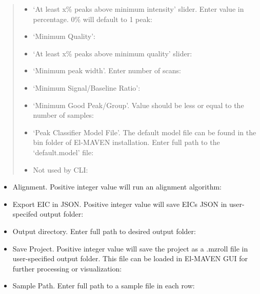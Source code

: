 \documentclass[letterpaper,10pt,english,openany,oneside]{sphinxmanual}
\begin{document}
\begin{quote}
\begin{itemize}
\item {} 
‘At least x\% peaks above minimum intensity’ slider. Enter value in percentage. 0\% will default to 1 peak: 

\item {} 
‘Minimum Quality’: 

\item {} 
‘At least x\% peaks above minimum quality’ slider: 

\item {} 
‘Minimum peak width’. Enter number of scans: 

\item {} 
‘Minimum Signal/Baseline Ratio’: 

\item {} 
‘Minimum Good Peak/Group’. Value should be less or equal to the number of samples: 

\item {} 
‘Peak Classifier Model File’. The default model file can be found in the bin folder of El-MAVEN installation. Enter full path to the ‘default.model’ file: 

\item {} 
Not used by CLI: 

\end{itemize}
\end{quote}

\begin{itemize}
\item {} 
Alignment. Positive integer value will run an alignment algorithm: 

\item {} 
Export EIC in JSON. Positive integer value will save EICs JSON in user-specifed output folder: 

\item {} 
Output directory. Enter full path to desired output folder: 

\item {} 
Save Project. Positive integer value will save the project as a .mzroll file in user-specified output folder. This file can be loaded in El-MAVEN GUI for further processing or visualization: 

\item {} 
Sample Path. Enter full path to a sample file in each row: 

\end{itemize}
\end{document}
